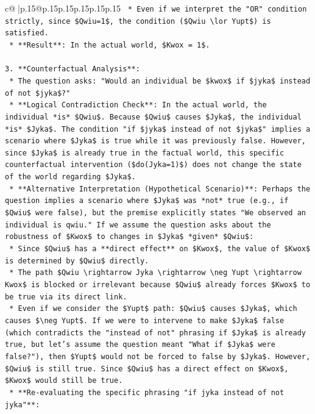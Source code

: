 \documentclass{article}
\begin{document}
{\begin{supertabular}{c@{$\;$}|p{.15\linewidth}@{}p{.15\linewidth}p{.15\linewidth}p{.15\linewidth}p{.15\linewidth}p{.15\linewidth}}
{{{\texttt{    *   Even if we interpret the "OR" condition strictly, since \$Qwiu=1\$, the condition (\$Qwiu \textbackslash{}lor Yupt\$) is satisfied.} \\
\texttt{    *   **Result**: In the actual world, \$Kwox = 1\$.} \\
\\ 
\texttt{3.  **Counterfactual Analysis**:} \\
\texttt{    *   The question asks: "Would an individual be \$kwox\$ if \$jyka\$ instead of not \$jyka\$?"} \\
\texttt{    *   **Logical Contradiction Check**: In the actual world, the individual *is* \$Qwiu\$. Because \$Qwiu\$ causes \$Jyka\$, the individual *is* \$Jyka\$. The condition "if \$jyka\$ instead of not \$jyka\$" implies a scenario where \$Jyka\$ is true while it was previously false. However, since \$Jyka\$ is already true in the factual world, this specific counterfactual intervention (\$do(Jyka=1)\$) does not change the state of the world regarding \$Jyka\$.} \\
\texttt{    *   **Alternative Interpretation (Hypothetical Scenario)**: Perhaps the question implies a scenario where \$Jyka\$ was *not* true (e.g., if \$Qwiu\$ were false), but the premise explicitly states "We observed an individual is qwiu." If we assume the question asks about the robustness of \$Kwox\$ to changes in \$Jyka\$ *given* \$Qwiu\$:} \\
\texttt{        *   Since \$Qwiu\$ has a **direct effect** on \$Kwox\$, the value of \$Kwox\$ is determined by \$Qwiu\$ directly.} \\
\texttt{        *   The path \$Qwiu \textbackslash{}rightarrow Jyka \textbackslash{}rightarrow \textbackslash{}neg Yupt \textbackslash{}rightarrow Kwox\$ is blocked or irrelevant because \$Qwiu\$ already forces \$Kwox\$ to be true via its direct link.} \\
\texttt{        *   Even if we consider the \$Yupt\$ path: \$Qwiu\$ causes \$Jyka\$, which causes \$\textbackslash{}neg Yupt\$. If we were to intervene to make \$Jyka\$ false (which contradicts the "instead of not" phrasing if \$Jyka\$ is already true, but let's assume the question meant "What if \$Jyka\$ were false?"), then \$Yupt\$ would not be forced to false by \$Jyka\$. However, \$Qwiu\$ is still true. Since \$Qwiu\$ has a direct effect on \$Kwox\$, \$Kwox\$ would still be true.} \\
\texttt{    *   **Re{-}evaluating the specific phrasing "if jyka instead of not jyka"**:} \\
}}}
\end{supertabular}}
\end{document}
